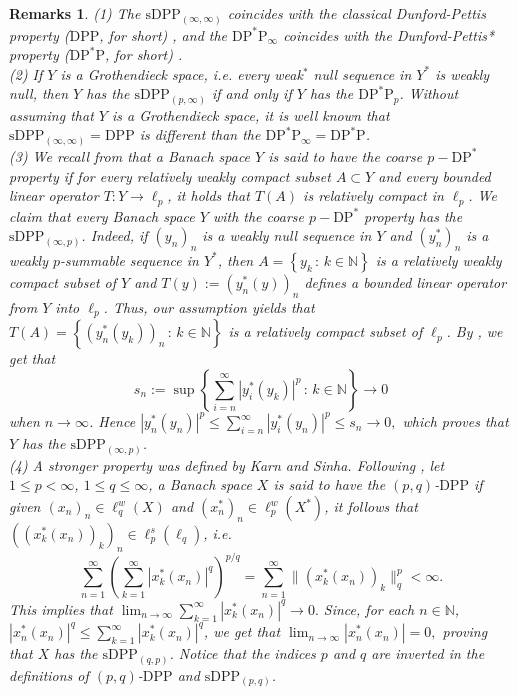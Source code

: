 \documentclass[12 pt]{article}%
\newtheorem{remarks}[theorem]{Remarks}
\newtheorem{final remark}[theorem]{Final Remark}
\newcommand {\N} {\mathbb{N}}
\newcommand{\norma}[1]{\| #1 \|}
\newcommand{\conj}[2]{\left \{ {#1} \, : \, {#2} \right \}}
\begin{document}
\begin{remarks}    \rm 
(1) The $\mathrm{sDPP}_{(\infty, \infty)}$ coincides with the classical Dunford-Pettis property ($\mathrm{DPP}$, for short) \cite[p. 340]{alip}, and the $\mathrm{DP}^*\mathrm{P}_{\infty}$ coincides with the Dunford-Pettis* property ($\mathrm{DP}^*\mathrm{P}$, for short) \cite{cargalou}.\\
(2) If $Y$ is a Grothendieck space, i.e. every weak$^*$ null sequence in $Y^*$ is weakly null, then $Y$ has the $\mathrm{sDPP}_{(p, \infty)}$ if and only if $Y$ has the $\mathrm{DP}^*\mathrm{P}_{p}$. Without assuming that $Y$ is a Grothendieck space, it is well known that $\mathrm{sDPP}_{(\infty, \infty)} = \mathrm{DPP}$ is different than the $\mathrm{DP}^*\mathrm{P}_{\infty} = \mathrm{DP}^*\mathrm{P}$. \\
(3) We recall from \cite{coarse} that a Banach space $Y$ is said to have the coarse $p-\mathrm{DP}^*$ property if for every relatively weakly compact subset $A \subset Y$ and every bounded linear operator $T: Y \to \ell_p$, it holds that $T(A)$ is relatively compact in $\ell_p$. We claim that every Banach space $Y$ with the coarse $p-\mathrm{DP}^*$ property has the $\mathrm{sDPP}_{(\infty, p)}$. Indeed, if $(y_n)_n$ is a weakly null sequence in $Y$ and $(y_n^*)_n$ is a weakly $p$-summable sequence in $Y^*$, then $A = \conj{y_k}{k \in \N}$ is a relatively weakly compact subset of $Y$ and $T(y):=(y_n^*(y))_n$ defines a bounded linear operator from $Y$ into $\ell_p$. Thus, our assumption yields that $T(A) = \conj{(y_n^*(y_k))_{n}}{k \in \N}$ is a relatively compact subset of $\ell_p$. By \cite[Exercise 15, p. 168]{alip}, we get that $$ s_n:= \sup \conj{\sum_{i=n}^\infty |y_i^*(y_k)|^p}{k \in \N} \to 0$$ when $n \to \infty$. Hence $ \displaystyle  |y_n^*(y_n)|^p \leq \sum_{i=n}^\infty |y_i^*(y_n)|^p \leq s_n \to 0, $ which proves that $Y$ has the $\mathrm{sDPP}_{(\infty, p)}$. \\
(4) A stronger property was defined by Karn and Sinha. Following \cite{karnsinha2}, let $1 \leq p < \infty$, $1 \leq q \leq \infty$, a Banach space $X$ is said to have the $(p,q)$-$\mathrm{DPP}$ if given $(x_n)_n \in \ell_q^w(X)$ and $(x_n^*)_n \in \ell_p^w(X^*)$, it follows that $((x_k^*(x_n))_k)_n\in \ell_p^s(\ell_q)$, i.e.
$$  \sum_{n=1}^\infty  \left ( \sum_{k=1}^\infty |x_k^*(x_n)|^{q} \right)^{p/q} =  \sum_{n=1}^\infty \norma{(x_k^*(x_n))_k}_q^p < \infty. $$
This implies that
$ \displaystyle \lim_{n \to \infty} \sum_{k=1}^\infty |x_k^*(x_n)|^{q} \longrightarrow 0. $
Since, for each $n \in \N$, $|x_n^*(x_n)|^q \leq \sum_{k=1}^\infty |x_k^*(x_n)|^{q}$, we get that
$ \displaystyle \lim_{n \to \infty} |x_n^*(x_n)| = 0, $
proving that $X$ has the $\mathrm{sDPP}_{(q,p)}$. Notice that the indices $p$ and $q$ are inverted in the definitions of $(p,q)$-$\mathrm{DPP}$ and $\mathrm{sDPP}_{(p,q)}$.
\end{remarks}
\end{document}
